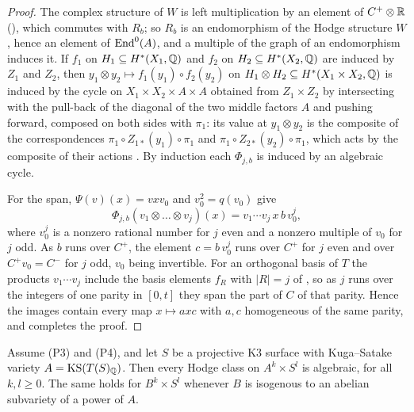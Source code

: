 \begin{proof}
The complex structure of $W$ is left multiplication by an element of
$C^{+}\otimes\mathbb{R}$ (), which commutes with $R_{b}$; so $R_{b}$
is an endomorphism of the Hodge structure $W$, hence an element of
$\operatorname{End}^{0}(A)$, and a multiple of the graph of an endomorphism induces it.
If $f_{1}$ on $H_{1}\subseteq H^{*}(X_{1},\mathbb{Q})$ and $f_{2}$ on
$H_{2}\subseteq H^{*}(X_{2},\mathbb{Q})$ are induced by $Z_{1}$ and $Z_{2}$, then
$y_{1}\otimes y_{2}\mapsto f_{1}(y_{1})\circ f_{2}(y_{2})$ on
$H_{1}\otimes H_{2}\subseteq H^{*}(X_{1}\times X_{2},\mathbb{Q})$ is induced by the
cycle on $X_{1}\times X_{2}\times A\times A$ obtained from
$Z_{1}\times Z_{2}$ by intersecting with the pull-back of the diagonal of the
two middle factors $A$ and pushing forward, composed on both sides with
$\pi_{1}$: its value at $y_{1}\otimes y_{2}$ is the composite of the
correspondences $\pi_{1}\circ Z_{1*}(y_{1})\circ\pi_{1}$ and
$\pi_{1}\circ Z_{2*}(y_{2})\circ\pi_{1}$, which acts by the composite of their
actions \cite[\S16.1]{Ful98}. By induction each $\Phi_{j,b}$ is induced by
an algebraic cycle.

For the span, $\Psi(v)(x)=vxv_{0}$ and $v_{0}^{2}=q(v_{0})$ give
\[
  \Phi_{j,b}(v_{1}\otimes\dots\otimes v_{j})(x)=v_{1}\cdots v_{j}\,x\,b\,v_{0}^{j},
\]
where $v_{0}^{j}$ is a nonzero rational number for $j$ even and a nonzero
multiple of $v_{0}$ for $j$ odd. As $b$ runs over $C^{+}$, the element
$c=b\,v_{0}^{j}$ runs over $C^{+}$ for $j$ even and over $C^{+}v_{0}=C^{-}$
for $j$ odd, $v_{0}$ being invertible. For an orthogonal basis of $T$ the
products $v_{1}\cdots v_{j}$ include the basis elements $f_{R}$ with $|R|=j$
of , so as $j$ runs over the integers of one parity in
$[0,t]$ they span the part of $C$ of that parity. Hence the images contain
every map $x\mapsto axc$ with $a,c$ homogeneous of the same parity, and
 completes the proof.
\end{proof}

\begin{theorem}\label{thm:kspowers}
Assume \textup{(P3)} and \textup{(P4)}, and let $S$ be a projective K3
surface with Kuga--Satake variety $A=\mathrm{KS}(T(S)_{\mathbb{Q}})$. Then every Hodge
class on $A^{k}\times S^{l}$ is algebraic, for all $k,l\ge0$. The same holds
for $B^{k}\times S^{l}$ whenever $B$ is isogenous to an abelian subvariety of
a power of $A$.
\end{theorem}

